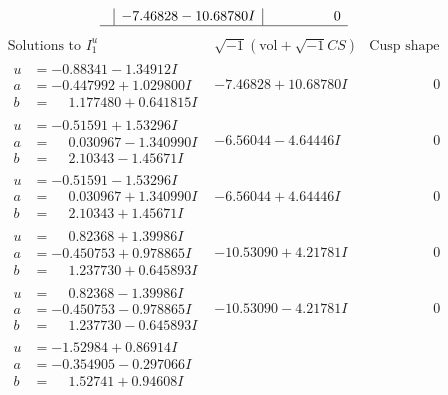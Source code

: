 \documentclass[1p]{elsarticle_modified}
\theoremstyle{definition}
\newcommand{\I}{\sqrt{-1}}
\begin{document}
$$\begin{array}{c|c|c}
 & -7.46828 - 10.68780 I & \phantom{-0.000000 } 0\\
 \hline 
 \end{array}$$\newpage$$\begin{array}{c|c|c}  
\text{Solutions to }I^u_{1}& \I (\text{vol} + \sqrt{-1}CS) & \text{Cusp shape}\\
 \hline 
\begin{aligned}
u &= -0.88341 - 1.34912 I \\
a &= -0.447992 + 1.029800 I \\
b &= \phantom{-}1.177480 + 0.641815 I\end{aligned}
 & -7.46828 + 10.68780 I & \phantom{-0.000000 } 0 \\ \hline\begin{aligned}
u &= -0.51591 + 1.53296 I \\
a &= \phantom{-}0.030967 - 1.340990 I \\
b &= \phantom{-}2.10343 - 1.45671 I\end{aligned}
 & -6.56044 - 4.64446 I & \phantom{-0.000000 } 0 \\ \hline\begin{aligned}
u &= -0.51591 - 1.53296 I \\
a &= \phantom{-}0.030967 + 1.340990 I \\
b &= \phantom{-}2.10343 + 1.45671 I\end{aligned}
 & -6.56044 + 4.64446 I & \phantom{-0.000000 } 0 \\ \hline\begin{aligned}
u &= \phantom{-}0.82368 + 1.39986 I \\
a &= -0.450753 + 0.978865 I \\
b &= \phantom{-}1.237730 + 0.645893 I\end{aligned}
 & -10.53090 + 4.21781 I & \phantom{-0.000000 } 0 \\ \hline\begin{aligned}
u &= \phantom{-}0.82368 - 1.39986 I \\
a &= -0.450753 - 0.978865 I \\
b &= \phantom{-}1.237730 - 0.645893 I\end{aligned}
 & -10.53090 - 4.21781 I & \phantom{-0.000000 } 0 \\ \hline\begin{aligned}
u &= -1.52984 + 0.86914 I \\
a &= -0.354905 - 0.297066 I \\
b &= \phantom{-}1.52741 + 0.94608 I\end{aligned}

\end{array}$$
\end{document}
